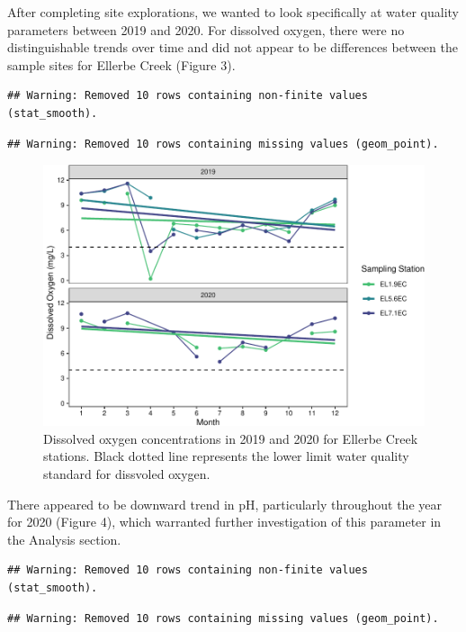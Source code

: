 \documentclass[
  12pt,
]{article}
\begin{document}
After completing site explorations, we wanted to look specifically at
water quality parameters between 2019 and 2020. For dissolved oxygen,
there were no distinguishable trends over time and did not appear to be
differences between the sample sites for Ellerbe Creek (Figure 3).

\begin{verbatim}
## Warning: Removed 10 rows containing non-finite values (stat_smooth).
\end{verbatim}

\begin{verbatim}
## Warning: Removed 10 rows containing missing values (geom_point).
\end{verbatim}

\begin{figure}
\centering
\includegraphics{August_Lindborg_ENV872_Project_files/figure-latex/unnamed-chunk-5-1.pdf}
\caption{Dissolved oxygen concentrations in 2019 and 2020 for Ellerbe
Creek stations. Black dotted line represents the lower limit water
quality standard for dissvoled oxygen.}
\end{figure}

There appeared to be downward trend in pH, particularly throughout the
year for 2020 (Figure 4), which warranted further investigation of this
parameter in the Analysis section.

\begin{verbatim}
## Warning: Removed 10 rows containing non-finite values (stat_smooth).
\end{verbatim}

\begin{verbatim}
## Warning: Removed 10 rows containing missing values (geom_point).
\end{verbatim}
\end{document}
